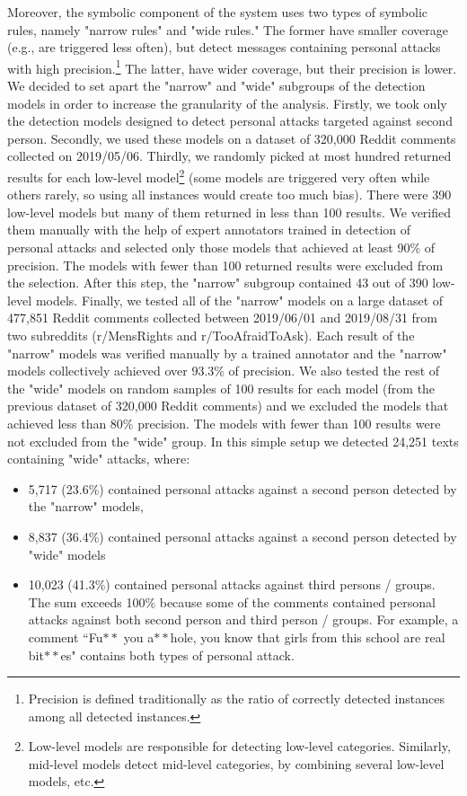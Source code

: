 \documentclass[a4paper,fleqn]{cas-dc}
\begin{document}
Moreover, the symbolic component of the system uses two types of symbolic rules, namely "narrow rules" and "wide rules." The former have smaller coverage (e.g., are triggered less often), but detect messages containing personal attacks with high precision.\footnote{Precision is defined traditionally as the ratio of correctly detected instances among all detected instances.} The latter, have wider coverage, but their precision is lower. 
We decided to set apart the "narrow" and "wide" subgroups of the detection models in order to increase the granularity of the analysis. Firstly, we took only the detection models designed to detect personal attacks targeted against second person. Secondly, we used these models on a dataset of 320,000 Reddit comments collected on 2019/05/06.
Thirdly, we randomly picked at most hundred returned results for each low-level model\footnote{Low-level models are responsible for detecting low-level categories. Similarly, mid-level models detect mid-level categories, by combining several low-level models, etc.} (some models are triggered very often while others rarely, so using all instances would create too much bias). There were 390 low-level models but many of them returned in less than 100 results. We verified them manually with the help of expert annotators trained in detection of personal attacks and selected only those models that achieved at least 90\% of precision. The models with fewer than 100 returned results were excluded from the selection. After this step, the "narrow" subgroup contained 43 out of 390 low-level models. Finally, we tested 
all of the "narrow" models on a large dataset of 477,851 Reddit comments collected between 2019/06/01 and 2019/08/31 from two subreddits (r/MensRights and r/TooAfraidToAsk). Each result of the "narrow" models was verified manually by a trained annotator and the "narrow" models collectively achieved over 93.3\% of precision. We also tested the rest of the "wide" models on random samples of 100 results for each model (from the previous dataset of 320,000 Reddit comments) and we excluded the models that achieved less than 80\% precision. The models with fewer than 100 results were not excluded from the "wide" group. In this simple setup we detected 24,251 texts containing "wide" attacks, where:
\begin{itemize}
\item  5,717 (23.6\%) contained personal attacks against a second person detected by the "narrow" models,
\item  8,837 (36.4\%) contained personal attacks against a second person detected by "wide" models
\item  10,023 (41.3\%) contained personal attacks against third persons / groups.
The sum exceeds 100\% because some of the comments contained personal attacks against both second person and third person / groups. For example, a comment ``Fu$\ast\ast$ you a$\ast\ast$hole, you know that girls from this school are real bit$\ast\ast$es" contains both types of personal attack.
\end{itemize}
\end{document}
